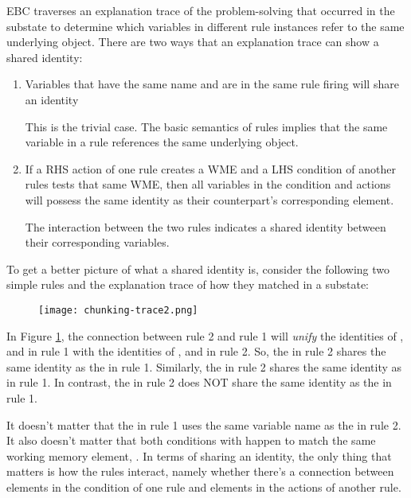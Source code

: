 EBC traverses an explanation trace of the problem-solving that occurred in the substate to determine which variables in different rule instances refer to the same underlying object.  There are two ways that an explanation trace can show a shared identity:

\begin{enumerate}
	\item Variables that have the same name and are in the same rule firing will share an identity

	This is the trivial case.  The basic semantics of rules implies that the same variable in a rule references the same underlying object.

	\item If a RHS action of one rule creates a WME and a LHS condition of another rules tests that same WME, then all variables in the condition and actions will possess the same identity as their counterpart's corresponding element. 

	The interaction between the two rules indicates a shared identity between their corresponding variables.
\end{enumerate}

To get a better picture of what a shared identity is, consider the following two simple rules and the explanation trace of how they matched in a substate: 

\begin{figure}[!h]
	\centering
	\texttt{[image: chunking-trace2.png]}
	\label{fig:chunking-trace2}
\end{figure}
\vspace{6pt}

In Figure \ref{fig:chunking-trace2}, the connection between rule 2 and rule 1 will \textit{unify} the identities of ,  and  in rule 1 with the identities of ,  and  in rule 2.  So, the  in rule 2 shares the same identity as the  in rule 1.  Similarly, the  in rule 2 shares the same identity as  in rule 1.  In contrast, the  in rule 2 does NOT share the same identity as the  in rule 1. 

It doesn't matter that the  in rule 1 uses the same variable name as the  in rule 2.  It also doesn't matter that both conditions with  happen to match the same working memory element, .  In terms of sharing an identity, the only thing that matters is how the rules interact, namely whether there's a connection between elements in the condition of one rule and elements in the actions of another rule.

